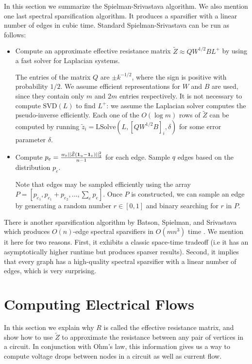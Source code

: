\documentclass{article}
\begin{document}
In this section we summarize the Spielman-Srivastava algorithm. We also
mention one last spectral sparsification algorithm. It produces a sparsifier
with a linear number of edges in cubic time.  Standard Spielman-Srivastava
can be run as follows:
\begin{itemize}
    \item Compute an approximate effective resistance matrix $\tilde{Z}
        \approx QW^{1/2}BL^+$ by using a fast solver for Laplacian systems.

        The entries of the matrix $Q$ are $\pm k^{-1/2}$, where the sign is
        positive with probability $1/2$. We assume efficient representations
        for $W$ and $B$ are used, since they contain only $m$ and $2m$
        entries respectively. It is not necessary to compute $\text{SVD}(L)$
        to find $L^+$: we assume the Laplacian solver computes the
        pseudo-inverse efficiently. Each one of the $O(\log m)$ rows of
        $\tilde{Z}$ can be computed by running $\tilde{z}_i =
        \text{LSolve}(L, [QW^{1/2}B]_i, \delta)$ for some error parameter
        $\delta$.

    \item Compute $p_e = \frac{w_e||\tilde{Z}(\mathbf{1}_u -
        \mathbf{1}_v)||^2_2}{n-1}$ for each edge. Sample $q$ edges based on the
        distribution $p_e$.

        Note that edges may be sampled efficiently using the array $P =
        [p_{e_1}, p_{e_1} + p_{e_2}, ..., \sum_e p_e]$. Once $P$ is
        constructed, we can sample an edge by generating a random number $r
        \in [0,1]$ and binary searching for $r$ in $P$. 
\end{itemize}
There is another sparsification algorithm by Batson, Spielman, and
Srivastava which produces $O(n)$-edge spectral sparsifiers in $O(mn^3)$ time
\cite{BatsonSpielmanSrivastava}. We mention it here for two reasons.  First,
it exhibits a classic space-time tradeoff (i.e it has an asymptotically
higher runtime but produces sparser results). Second, it implies that every
graph has a high-quality spectral sparsifier with a linear number of edges,
which is very surprising.

\section{Computing Electrical Flows}

In this section we explain why $R$ is called the effective resistance
matrix, and show how to use $\tilde{Z}$ to approximate the resistance
between any pair of vertices in a circuit. In conjunction with Ohm's law,
this information gives us a way to compute voltage drops between nodes in a
circuit as well as current flow.
\end{document}
